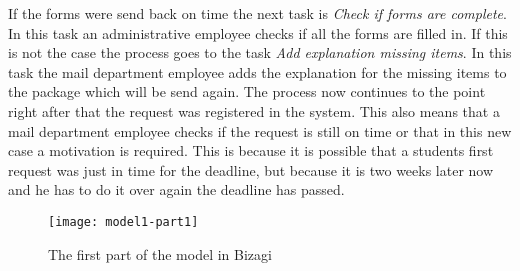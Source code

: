 If the forms were send back on time the next task is \emph{Check if forms are complete}. In this task an administrative employee checks if all the forms are filled in. If this is not the case the process goes to the task \emph{Add explanation missing items}. In this task the mail department employee adds the explanation for the missing items to the package which will be send again. The process now continues to the point right after that the request was registered in the system. This also means that a mail department employee checks if the request is still on time or that in this new case a motivation is required. This is because it is possible that a students first request was just in time for the deadline, but because it is two weeks later now and he has to do it over again the deadline has passed.

\begin{figure}[!ht]
\begin{center}
	\texttt{[image: model1-part1]}
	\caption{The first part of the model in Bizagi}
	\label{fig:model1-part1}
\end{center}
\end{figure}

